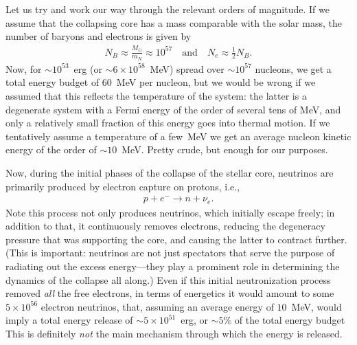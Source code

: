 Let us try and work our way through the relevant orders of magnitude. If we assume that
the collapsing core has a mass comparable with the solar mass, the number of baryons
and electrons is given by
\begin{align*}
  N_B \approx \frac{M_\odot}{m_N} \approx 10^{57} \quad\text{and}\quad
  N_e \approx \frac{1}{2} N_B.
\end{align*}
Now, for $\sim 10^{53}$~erg (or $\sim 6 \times 10^{58}$~MeV) spread over
$\sim 10^{57}$ nucleons, we get a total energy budget of 60~MeV per nucleon, but
we would be wrong if we assumed that this reflects the temperature of the system:
the latter is a degenerate system with a Fermi energy of the order of several
tens of MeV, and only a relatively small fraction of this energy goes into thermal
motion. If we tentatively assume a temperature of a few~MeV
we get an average nucleon kinetic energy of the order of $\sim 10$~MeV. Pretty crude,
but enough for our purposes.

Now, during the initial phases of the collapse of the stellar core, neutrinos are
primarily produced by electron capture on protons, i.e.,
\begin{align*}
  p + e^- \rightarrow n + \nu_e.
\end{align*}
Note this process not only produces neutrinos, which initially escape freely;
in addition to that, it continuously removes electrons, reducing the degeneracy
pressure that was supporting the core, and causing the latter to contract
further. (This is important: neutrinos are not just spectators that serve the
purpose of radiating out the excess energy---they play a prominent role in
determining the dynamics of the collapse all along.)
Even if this initial neutronization process removed \emph{all} the free electrons,
in terms of energetics it would amount to some $5 \times 10^{56}$ electron neutrinos,
that, assuming an average energy of $10$~MeV, would imply a total energy release of
$\sim 5 \times 10^{51}$~erg, or $\sim 5$\% of the total energy budget
This is definitely \emph{not} the main mechanism through which the energy is released.

